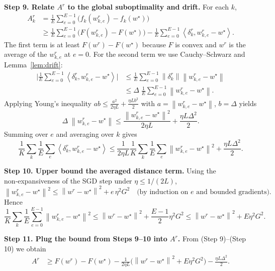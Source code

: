 \documentclass{article}
\newcommand{\norm}[1]{\left\lVert#1\right\rVert}
\newcommand{\ip}[2]{\left\langle #1,#2\right\rangle}
\begin{document}
\noindent\textbf{Step 9.  Relate $A^{r}$ to the global suboptimality and drift.}  
For each $k$,
\[
\begin{aligned}
    A_{k}^{r}
    &=\frac1E\sum_{e=0}^{E-1}\big(f_k(w_{k,e}^{r})-f_k(w^{\star})\big)\\
    &\ge \frac1E\sum_{e=0}^{E-1}\big(F(w_{k,e}^{r})-F(w^{\star})\big)
        -\frac1E\sum_{e=0}^{E-1}\ip{\delta_{k}^{r}}{w_{k,e}^{r}-w^{\star}}.
\end{aligned}
\tag{Step 9}
\]
The first term is at least $F(w^{r})-F(w^{\star})$ because $F$ is convex and $w^{r}$ is the average of the $w_{k,e}^{r}$ at $e=0$.  For the second term we use Cauchy–Schwarz and Lemma~\ref{lem:drift}:
\[
\begin{aligned}
    \Big|\frac1E\sum_{e=0}^{E-1}\ip{\delta_{k}^{r}}{w_{k,e}^{r}-w^{\star}}\Big|
    &\le
    \frac1E\sum_{e=0}^{E-1}\norm{\delta_{k}^{r}}\norm{w_{k,e}^{r}-w^{\star}}\\
    &\le
    \Delta\;\frac1E\sum_{e=0}^{E-1}\norm{w_{k,e}^{r}-w^{\star}}.
\end{aligned}
\tag{Step 9a}
\]
Applying Young’s inequality $ab\le\frac{a^{2}}{2\eta L}+ \frac{\eta L b^{2}}{2}$ with $a=\norm{w_{k,e}^{r}-w^{\star}}$, $b=\Delta$ yields
\[
    \Delta\;\norm{w_{k,e}^{r}-w^{\star}}
    \le \frac{\norm{w_{k,e}^{r}-w^{\star}}^{2}}{2\eta L}
      +\frac{\eta L\Delta^{2}}{2}.
\tag{Step 9b}
\]
Summing over $e$ and averaging over $k$ gives
\[
    \frac1K\sum_{k} \frac1E\sum_{e}\ip{\delta_{k}^{r}}{w_{k,e}^{r}-w^{\star}}
    \le
    \frac{1}{2\eta L}\frac1K\sum_{k}\frac1E\sum_{e}\norm{w_{k,e}^{r}-w^{\star}}^{2}
    +\frac{\eta L\Delta^{2}}{2}. \tag{Step 9c}
\]

\noindent\textbf{Step 10.  Upper bound the averaged distance term.}  
Using the non‑expansiveness of the SGD step under $\eta\le 1/(2L)$,
\[
    \norm{w_{k,e}^{r}-w^{\star}}^{2}
    \le
    \norm{w^{r}-w^{\star}}^{2}+e\,\eta^{2}G^{2}
    \quad\text{(by induction on $e$ and bounded gradients)}.
\]
Hence
\[
    \frac1K\sum_{k}\frac1E\sum_{e=0}^{E-1}\norm{w_{k,e}^{r}-w^{\star}}^{2}
    \le
    \norm{w^{r}-w^{\star}}^{2}+ \frac{E-1}{2}\eta^{2}G^{2}
    \le
    \norm{w^{r}-w^{\star}}^{2}+E\eta^{2}G^{2}. \tag{Step 10}
\]

\noindent\textbf{Step 11.  Plug the bound from Steps 9–10 into $A^{r}$.}
From (Step 9)–(Step 10) we obtain
\[
\begin{aligned}
    A^{r}
    &\ge F(w^{r})-F(w^{\star})
      -\frac{1}{2\eta L}\Big(\norm{w^{r}-w^{\star}}^{2}+E\eta^{2}G^{2}\Big)
      -\frac{\eta L\Delta^{2}}{2}. \tag{Step 11}
\end{aligned}
\]
\end{document}
